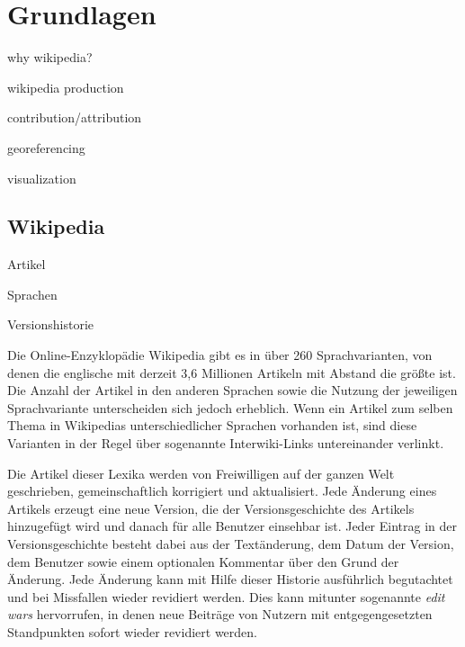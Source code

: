 \chapter{Grundlagen}\label{ch:foundation}

\begin{todos}
    \item why wikipedia?
    \item wikipedia production
    \item contribution/attribution
    \item georeferencing
    \item visualization
\end{todos}

\section{Wikipedia}


\begin{todos}
    \item Artikel
    \item Sprachen
    \item Versionshistorie
\end{todos}

Die Online-Enzyklopädie Wikipedia gibt es in über 260 Sprachvarianten, von denen die englische mit derzeit 3,6 Millionen Artikeln mit Abstand die größte ist.
Die Anzahl der Artikel in den anderen Sprachen sowie die Nutzung der jeweiligen Sprachvariante unterscheiden sich jedoch erheblich.\cite{wikistats}
Wenn ein Artikel zum selben Thema in Wikipedias unterschiedlicher Sprachen vorhanden ist, sind diese Varianten in der Regel über sogenannte Interwiki-Links untereinander verlinkt.

Die Artikel dieser Lexika werden von Freiwilligen auf der ganzen Welt geschrieben, gemeinschaftlich korrigiert und aktualisiert.
Jede Änderung eines Artikels erzeugt eine neue Version, die der Versionsgeschichte des Artikels hinzugefügt wird und danach für alle Benutzer einsehbar ist.
Jeder Eintrag in der Versionsgeschichte besteht dabei aus der Textänderung, dem Datum der Version, dem Benutzer sowie einem optionalen Kommentar über den Grund der Änderung.
Jede Änderung kann mit Hilfe dieser Historie ausführlich begutachtet und bei Missfallen wieder revidiert werden. 
Dies kann mitunter sogenannte \emph{edit wars} hervorrufen, in denen neue Beiträge von Nutzern mit entgegengesetzten Standpunkten sofort wieder revidiert werden.\cite{suh2007us} 

